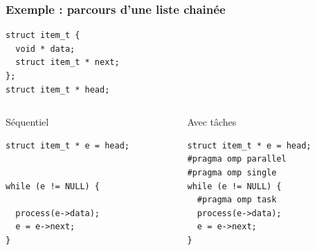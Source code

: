 \documentclass{beamer}
\begin{document}

\begin{frame}[fragile]
  \frametitle{Exemple : parcours d'une liste chainée}

\begin{verbatim}
struct item_t {
  void * data;
  struct item_t * next;
};
struct item_t * head;
\end{verbatim}

\begin{columns}[T]
  \begin{column}{0.49\textwidth}
    \begin{block}{Séquentiel}
\begin{verbatim}
struct item_t * e = head;


while (e != NULL) {

  process(e->data);
  e = e->next;
}
\end{verbatim}
    \end{block}
  \end{column}

  \begin{column}{0.49\textwidth}
    \begin{block}{Avec tâches\phantom{Sq}}
\begin{verbatim}
struct item_t * e = head;
#pragma omp parallel
#pragma omp single
while (e != NULL) {
  #pragma omp task
  process(e->data);
  e = e->next;
}
\end{verbatim}
    \end{block}
  \end{column}
\end{columns}
\end{frame}
\end{document}

